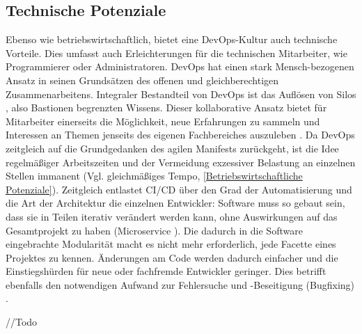 \subsection{Technische Potenziale}
\label{Technische Potenziale}
Ebenso wie betriebswirtschaftlich, bietet eine \gls{DevOps}-Kultur auch technische Vorteile. Dies umfasst auch Erleichterungen für die technischen Mitarbeiter, wie Programmierer oder Administratoren. \gls{DevOps} hat einen stark Mensch-bezogenen Ansatz in seinen Grundsätzen des offenen und gleichberechtigen Zusammenarbeitens. Integraler Bestandteil von \gls{DevOps} ist das Auflösen von \glqq{}Silos\grqq{} \cite{leite_survey_2020}, also Bastionen begrenzten Wissens. Dieser kollaborative Ansatz bietet für Mitarbeiter einerseits die Möglichkeit, neue Erfahrungen zu sammeln und Interessen an Themen jenseits des eigenen Fachbereiches auszuleben \cite{leite_survey_2020}. Da \gls{DevOps} zeitgleich auf die Grundgedanken des agilen Manifests zurückgeht, ist die Idee regelmäßiger Arbeitszeiten und der Vermeidung exzessiver Belastung an einzelnen Stellen immanent (Vgl. \glqq{}gleichmäßiges Tempo\grqq{}, \ref{Betriebswirtschaftliche Potenziale}).
Zeitgleich entlastet \acrshort{CI}/\acrshort{CD} über den Grad der Automatisierung und die Art der Architektur die einzelnen Entwickler: Software muss so gebaut sein, dass sie in Teilen iterativ verändert werden kann, ohne Auswirkungen auf das Gesamtprojekt zu haben (\glqq{}Microservice\grqq{} \cite[S. 14]{leite_survey_2020}). Die dadurch in die Software eingebrachte Modularität macht es nicht mehr erforderlich, jede Facette eines Projektes zu kennen. Änderungen am Code werden dadurch einfacher und die Einstiegshürden für neue oder fachfremde Entwickler geringer. Dies betrifft ebenfalls den notwendigen Aufwand zur Fehlersuche und -Beseitigung (Bugfixing) \cite{hilton_usage_2016}.

//Todo
